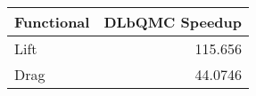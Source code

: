 \begin{tabular}{lr}
\toprule
 Functional   &   DLbQMC Speedup \\
\midrule
 Lift         &         115.656  \\
 Drag         &          44.0746 \\
\bottomrule
\end{tabular}
